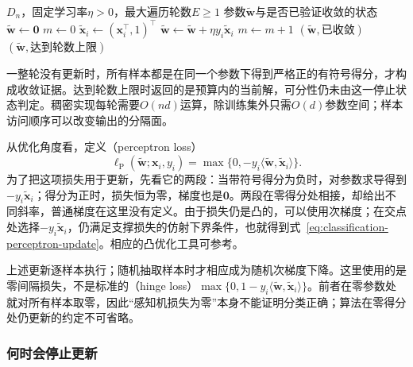 \begin{algorithm}[带遍历上限的感知机训练]
  \label{alg:classification-perceptron}
  \begin{algorithmic}[1]
    \Require $D_n$，固定学习率$\eta>0$，最大遍历轮数$E\geq1$
    \Ensure 参数$\tilde{\bm{w}}$与是否已验证收敛的状态
    \State $\tilde{\bm{w}}\gets\bm{0}$
      \State $m\gets0$
        \State $\tilde{\bm{x}}_i\gets(\bm{x}_i^{\top},1)^{\top}$
          \State $\tilde{\bm{w}}\gets\tilde{\bm{w}}+\eta y_i\tilde{\bm{x}}_i$
          \State $m\gets m+1$
        \EndIf
      \EndFor
        \State \Return $(\tilde{\bm{w}},\text{已收敛})$
      \EndIf
    \EndFor
    \State \Return $(\tilde{\bm{w}},\text{达到轮数上限})$
  \end{algorithmic}
\end{algorithm}

一整轮没有更新时，所有样本都是在同一个参数下得到严格正的有符号得分，才构成收敛证据。达到轮数上限时返回的是预算内的当前解，可分性仍未由这一停止状态判定。稠密实现每轮需要$O(nd)$运算，除训练集外只需$O(d)$参数空间；样本访问顺序可以改变输出的分隔面。

从优化角度看，定义（perceptron loss）
\begin{equation}
  \label{eq:classification-perceptron-loss}
  \ell_{\mathrm{P}}(\tilde{\bm{w}};\bm{x}_i,y_i)
    =\max\{0,-y_i\langle\tilde{\bm{w}},\tilde{\bm{x}}_i\rangle\}.
\end{equation}
为了把这项损失用于更新，先看它的两段：当带符号得分为负时，对参数求导得到$-y_i\tilde{\bm{x}}_i$；得分为正时，损失恒为零，梯度也是$\bm 0$。两段在零得分处相接，却给出不同斜率，普通梯度在这里没有定义。由于损失仍是凸的，可以使用次梯度；在交点处选择$-y_i\tilde{\bm{x}}_i$，仍满足支撑损失的仿射下界条件，也就得到式~\eqref{eq:classification-perceptron-update}。相应的凸优化工具可参考。

上述更新逐样本执行；随机抽取样本时才相应成为随机次梯度下降。这里使用的是零间隔损失，不是标准的（hinge loss）$\max\{0,1-y_i\langle\tilde{\bm{w}},\tilde{\bm{x}}_i\rangle\}$。前者在零参数处就对所有样本取零，因此“感知机损失为零”本身不能证明分类正确；算法在零得分处仍更新的约定不可省略。

\subsubsection{何时会停止更新}
\label{sec:classification-perceptron-analysis}

